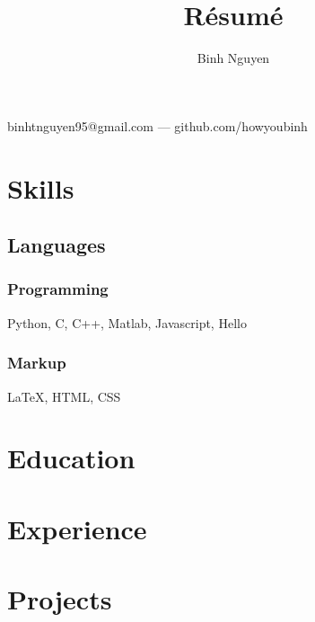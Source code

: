 \documentclass{article}
\makeatletter
\renewcommand{\maketitle}{
\begin{center}
{\huge\bfseries
\theauthor}

\vspace{.25em}

binhtnguyen95@gmail.com --- github.com/howyoubinh

\end{center}
}
\makeatother
\begin{document}
\title{R\'esum\'e}
\author{Binh Nguyen}

\maketitle

\section{Skills}

\subsection{Languages}

\subsubsection{Programming}

Python, C, C++, Matlab, Javascript, Hello

\subsubsection{Markup}

{\LaTeX}, HTML, CSS

\section{Education}

\section{Experience}

\section{Projects}
\end{document}
